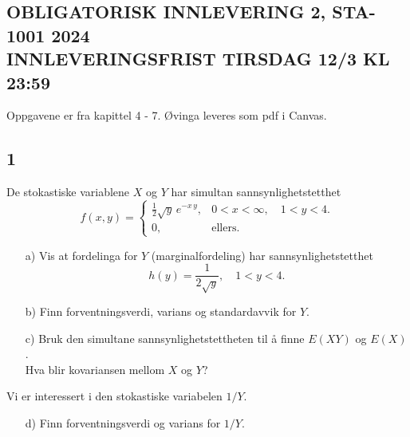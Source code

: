 \documentclass[10pt,a4paper]{article}
\begin{document}
\begin{center}
\section*{OBLIGATORISK INNLEVERING 2, STA-1001 2024
\\
INNLEVERINGSFRIST TIRSDAG 12/3 KL 23:59}
\end{center}
Oppgavene er fra kapittel 4 - 7.
{\O}vinga leveres som pdf i Canvas.
\\
\subsection*{1}
De stokastiske variablene $X$ og $Y$ har simultan sannsynlighetstetthet
\[
f(x,y) = \left\{\begin{array}{ll}
\frac{1}{2}\sqrt{y}\,e^{-x\,y}, & 0<x<\infty,\quad 1<y<4.
\\
0, & \mbox{ellers.}
\end{array}\right.
\]
\begin{itemize}
\item[a)\protect{\hspace{3.5mm}}]
Vis at fordelinga for $Y$ (marginalfordeling) har sannsynlighetstetthet
\[
h(y) = \frac{1}{2\sqrt{y}},\quad 1 < y < 4.
\]
\end{itemize}
\begin{itemize}
\item[b)\protect{\hspace{3.5mm}}]
Finn forventningsverdi, varians og standardavvik for $Y$.
\end{itemize}
\begin{itemize}
\item[c)\protect{\hspace{3.5mm}}]
Bruk den simultane sannsynlighetstettheten til {\aa} finne $E(XY)$ og $E(X)$.
\\
Hva blir kovariansen mellom $X$ og $Y$?
\end{itemize}
Vi er interessert i den stokastiske variabelen $1/Y$.
\begin{itemize}
\item[d)\protect{\hspace{3.5mm}}]
Finn forventningsverdi og varians for $1/Y$.
\end{itemize}
\end{document}
